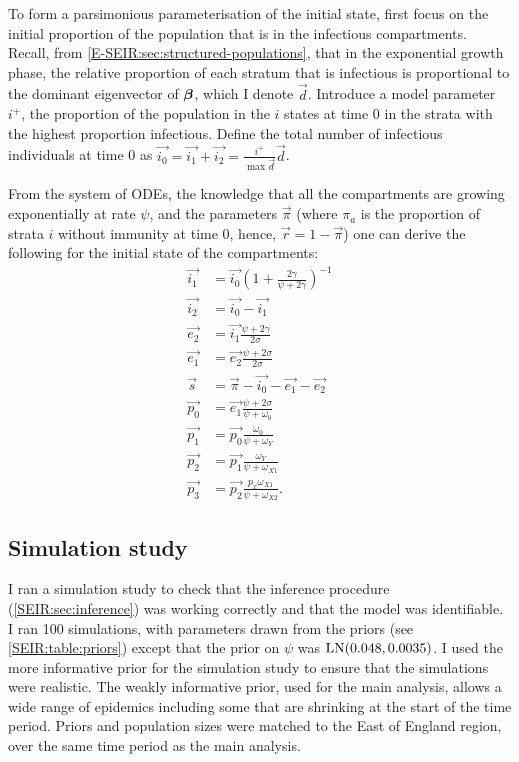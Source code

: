 \documentclass[thesis.tex]{subfiles}
\begin{document}
To form a parsimonious parameterisation of the initial state, first focus on the initial proportion of the population that is in the infectious compartments.
Recall, from \cref{E-SEIR:sec:structured-populations}, that in the exponential growth phase, the relative proportion of each stratum that is infectious is proportional to the dominant eigenvector of $\bm{\beta}$, which I denote $\vec{d}$.
Introduce a model parameter $i^+$, the proportion of the population in the $i$ states at time 0 in the strata with the highest proportion infectious.
Define the total number of infectious individuals at time 0 as $\vec{i_0} = \vec{i_1} + \vec{i_2} = \frac{i^+}{\max \vec{d}} \vec{d}$.

From the system of ODEs, the knowledge that all the compartments are growing exponentially at rate $\psi$, and the parameters $\vec{\pi}$ (where $\pi_a$ is the proportion of strata $i$ without immunity at time 0, hence, $\vec{r} = 1 - \vec{\pi}$) one can derive the following for the initial state of the compartments:
\begin{align}
    \vec{i_1} &= \vec{i_0} \left(1 + \frac{2\gamma}{\psi + 2\gamma} \right)^{-1} \\
    \vec{i_2} &= \vec{i_0} - \vec{i_1} \\
    \vec{e_2} &= \vec{i_1} \frac{\psi + 2\gamma}{2\sigma} \\
    \vec{e_1} &= \vec{e_2} \frac{\psi + 2\sigma}{2\sigma} \\
    \vec{s} &= \vec{\pi} - \vec{i_0} - \vec{e_1} - \vec{e_2} \\
    \vec{p_0} &= \vec{e_1} \frac{\psi + 2\sigma}{\psi + \omega_0} \\
    \vec{p_1} &= \vec{p_0} \frac{\omega_0}{\psi + \omega_Y} \\
    \vec{p_2} &= \vec{p_1} \frac{\omega_Y}{\psi + \omega_{X1}} \\
    \vec{p_3} &= \vec{p_2} \frac{p_x \omega_{X1}}{\psi + \omega_{X2}}.
\end{align}

\subsection{Simulation study} \label{SEIR:sec:sim-study}

I ran a simulation study to check that the inference procedure (\cref{SEIR:sec:inference}) was working correctly and that the model was identifiable.
I ran 100 simulations, with parameters drawn from the priors (see \cref{SEIR:table:priors}) except that the prior on $\psi$ was $\operatorname{LN}(0.048, 0.0035)$.
I used the more informative prior for the simulation study to ensure that the simulations were realistic.
The weakly informative prior, used for the main analysis, allows a wide range of epidemics including some that are shrinking at the start of the time period.
Priors and population sizes were matched to the East of England region, over the same time period as the main analysis.
\end{document}
